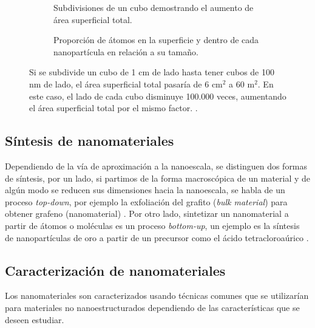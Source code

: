 \begin{figure}[h!]
	\centering
	\begin{subfigure}{\textwidth}
		\caption[Subdivisiones de un cubo demostrando el aumento de área superficial total]{Subdivisiones de un cubo demostrando el aumento de área superficial total.}
		\label{fig:area_cubes}
	\end{subfigure}
	\begin{subfigure}{\textwidth}
			\caption{Proporción de átomos en la superficie y dentro de cada nanopartícula en relación a su tamaño.}
			\label{fig:graph_nanocube}
	\end{subfigure}
	\caption[Aumento de área superficial y proporcion de átomos en superficie al disminuir el tamaño de las nanopartículas]{Si se subdivide un cubo de 1 cm de lado hasta tener cubos de 100 nm de lado, el área superficial total pasaría de 6 $\mathrm{cm^2}$ a 60 $\mathrm{m^2}$. En este caso, el lado de cada cubo disminuye 100.000 veces, aumentando el área superficial total por el mismo factor. .}
\end{figure}

\subsection{Síntesis de nanomateriales}
Dependiendo de la vía de aproximación a la nanoescala, se distinguen dos formas de síntesis, por un lado, si partimos de la forma macroscópica de un material y de algún modo se reducen sus dimensiones hacia la nanoescala, se habla de un proceso \textit{top-down}, por ejemplo la exfoliación del grafito (\textit{bulk material}) para obtener grafeno (nanomaterial) \citep{Novoselov2004}.  Por otro lado, sintetizar un nanomaterial a partir de átomos o moléculas es un proceso \textit{bottom-up}, un ejemplo es la síntesis de nanopartículas de oro a partir de un precursor como el ácido tetracloroaúrico \citep{Daniel2004}.

\subsection{Caracterización de nanomateriales}
Los nanomateriales son caracterizados usando técnicas comunes que se utilizarían para materiales no nanoestructurados dependiendo de las características que se deseen estudiar.
